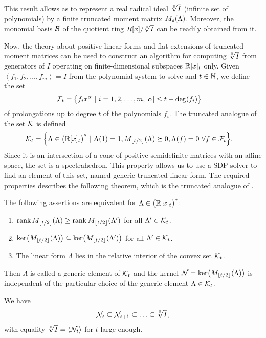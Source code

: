 This result allows as to represent a real radical ideal $\sqrt[\mathbb{R}]{I}$ (infinite set of polynomials) by a finite truncated moment matrix $M_s(\Lambda)$.
Moreover, the monomial basis $\mathcal{B}$ of the quotient ring $R[x]/\sqrt[\mathbb{R}]{I}$ can be readily obtained from it.

Now, the theory about positive linear forms and flat extensions of truncated moment matrices can be used to construct an algorithm for computing $\sqrt[\mathbb{R}]{I}$ from generators of $I$ operating on finite-dimensional subspaces $\mathbb{R}[x]_t$ only.
Given $\left<f_1, f_2, \ldots, f_m\right> = I$ from the polynomial system  to solve and $t\in\mathbb{N}$, we define the set
\begin{align}
  \mathcal{F}_t &= \big\{f_ix^\alpha\ |\ i = 1, 2, \ldots, m, |\alpha|\leq t-\deg(f_i)\big\}
\end{align}
of prolongations up to degree $t$ of the polynomials $f_i$.
The truncated analogue of the set $\mathcal{K}$ is defined
\begin{align}
  \mathcal{K}_t &= \Big\{\Lambda\in\big(\mathbb{R}[x]_{t}\big)^*\ |\ \Lambda(1) = 1, M_{\lfloor t/2\rfloor}(\Lambda) \succeq 0, \Lambda(f) = 0 \ \forall f\in\mathcal{F}_t\Big\}.
\end{align}
Since it is an intersection of a cone of positive semidefinite matrices with an affine space, the set is a spectrahedron.
This property allows us to use a SDP solver to find an element of this set, named generic truncated linear form.
The required properties describes the following theorem, which is the truncated analogue of .

\begin{theorem}
  The following assertions are equivalent for $\Lambda\in\big(\mathbb{R}[x]_{t}\big)^*$:
  \begin{enumerate}
    \item $\operatorname{rank}M_{\lfloor t/2\rfloor}(\Lambda) \geq \operatorname{rank} M_{\lfloor t/2\rfloor}(\Lambda')$ for all $\Lambda'\in\mathcal{K}_t$.
    \item $\operatorname{ker}\!\big(M_{\lfloor t/2\rfloor}(\Lambda)\big) \subseteq \operatorname{ker}\!\big(M_{\lfloor t/2\rfloor}(\Lambda')\big)$ for all $\Lambda'\in\mathcal{K}_t$.
    \item The linear form $\Lambda$ lies in the relative interior of the convex set $\mathcal{K}_t$.
  \end{enumerate}
  Then $\Lambda$ is called a generic element of $\mathcal{K}_t$ and the kernel $\mathcal{N} = \operatorname{ker}\!\big(M_{\lfloor t/2\rfloor}(\Lambda)\big)$ is independent of the particular choice of the generic element $\Lambda\in\mathcal{K}_t$.
\end{theorem}

\begin{theorem}
  We have
  \begin{align}
    \mathcal{N}_t \subseteq \mathcal{N}_{t+1} \subseteq \ldots \subseteq \sqrt[\mathbb{R}]{I},
  \end{align}
  with equality $\sqrt[\mathbb{R}]{I} = \left<\mathcal{N}_t\right>$ for $t$ large enough.
\end{theorem}

